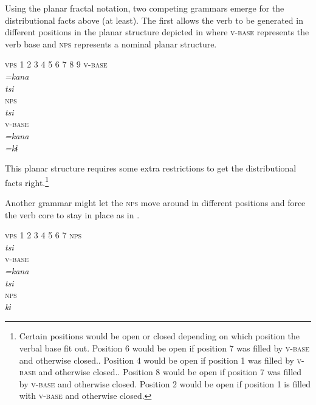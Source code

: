 \documentclass[output=paper,hidelinks]{langscibook}
\begin{document}
Using the planar fractal notation, two competing grammars emerge for the distributional facts above (at least). The first allows the verb to be generated in different positions in the planar structure depicted in  where \textsc{v-base} represents the verb base and \textsc{nps} represents a nominal planar structure.

\ea \label{rules:movingverb}
    \ea \textsc{vps} \rightarrow{} 1 2 3 4 5 6 7 8 9
      \rightarrow{} \textsc{v-base} \\
     \rightarrow{} \textit{=kana} \\
     \rightarrow{} \textit{tsi} \\
     \rightarrow{} \textsc{nps} \\
     \rightarrow{} \textit{tsi} \\
     \rightarrow{} \textsc{v-base} \\ 
     \rightarrow{} \textit{=kana} \\
     \rightarrow{} \textit{=kɨ}
    \z 
\z 

This planar structure requires some extra restrictions to get the distributional facts right.\footnote{Certain positions would be open or closed depending on which position the verbal base fit out. Position 6 would be open if position 7 was filled by \textsc{v-base} and otherwise closed.. Position 4 would be open if position 1 was filled by \textsc{v-base} and otherwise closed.. Position 8 would be open if position 7 was filled by \textsc{v-base} and otherwise closed. Position 2 would be open if position 1 is filled with \textsc{v-base} and otherwise closed.}

Another grammar might let the \textsc{nps} move around in different positions and force the verb core to stay in place as in .

\ea \label{rules:movingnoun}
    \ea \textsc{vps} \rightarrow{} 1 2 3 4 5 6 7 
      \rightarrow{} \textsc{nps} \\
     \rightarrow{} \textit{tsi} \\
     \rightarrow{} \textsc{v-base} \\
     \rightarrow{} \textit{=kana} \\
      \rightarrow{} \textit{tsi} \\
     \rightarrow{} \textsc{nps} \\
     \rightarrow{} \textit{kɨ}
    \z 
\z 
\end{document}
